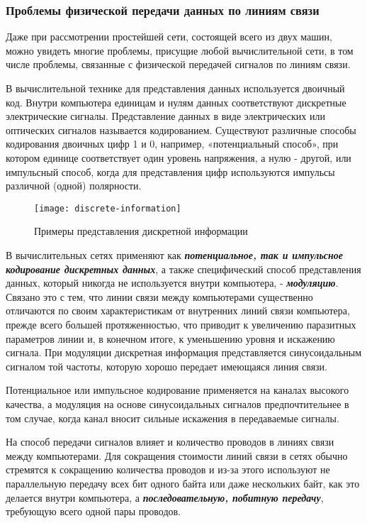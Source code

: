 \subsubsection{Проблемы физической передачи данных по линиям связи}

Даже при рассмотрении простейшей сети, состоящей всего из двух машин, можно увидеть многие проблемы, присущие любой вычислительной сети, в том числе проблемы, связанные с физической передачей сигналов по линиям связи.

В вычислительной технике для представления данных используется двоичный код.
Внутри компьютера единицам и нулям данных соответствуют дискретные электрические сигналы.
Представление данных в виде электрических или оптических сигналов называется кодированием.
Существуют различные способы кодирования двоичных цифр 1 и 0, например, «потенциальный способ», при котором единице соответствует один уровень напряжения, а нулю - другой, или импульсный способ, когда для представления цифр используются импульсы различной (одной) полярности.

\begin{figure}[!ht]
    \centering
    \texttt{[image: discrete-information]}
    \caption{Примеры представления дискретной информации}
    \label{fig:discrete-information}
\end{figure}

В вычислительных сетях применяют как \textbf{\textit{потенциальное, так и импульсное кодирование дискретных данных}}, а также специфический способ представления данных, который никогда не используется внутри компьютера, - \textbf{\textit{модуляцию}}.
Связано это с тем, что линии связи между компьютерами существенно отличаются по своим характеристикам от внутренних линий связи компьютера, прежде всего большей протяженностью, что приводит к увеличению паразитных параметров линии и, в конечном итоге, к уменьшению уровня и искажению сигнала.
При модуляции дискретная информация представляется синусоидальным сигналом той частоты, которую хорошо передает имеющаяся линия связи.

Потенциальное или импульсное кодирование применяется на каналах высокого качества, а модуляция на основе синусоидальных сигналов предпочтительнее в том случае, когда канал вносит сильные искажения в передаваемые сигналы.

На способ передачи сигналов влияет и количество проводов в линиях связи между компьютерами.
Для сокращения стоимости линий связи в сетях обычно стремятся к сокращению количества проводов и из-за этого используют не параллельную передачу всех бит одного байта или даже нескольких байт, как это делается внутри компьютера, а \textbf{\textit{последовательную, побитную передачу}}, требующую всего одной пары проводов.

